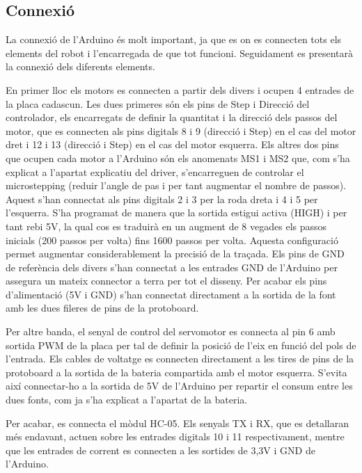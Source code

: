 \subsection{Connexió}

La connexió de l’Arduino és molt important, ja que es on es connecten tots els elements del robot i l’encarregada de que tot funcioni. Seguidament es presentarà la connexió dels diferents elements.

En primer lloc els motors es connecten a partir dels divers i ocupen 4 entrades de la placa cadascun. Les dues primeres són els pins de Step i Direcció del controlador, els encarregats de definir la quantitat i la direcció dels passos del motor, que es connecten als pins digitals 8 i 9 (direcció i Step) en el cas del motor dret i 12 i 13 (direcció i Step) en el cas del motor esquerra. Els altres dos pins que ocupen cada motor a l’Arduino són els anomenats MS1 i MS2 que, com s’ha explicat a l’apartat explicatiu del driver, s’encarreguen de controlar el microstepping (reduir l’angle de pas i per tant augmentar el nombre de passos). Aquest s’han connectat als pins digitals 2 i 3 per la roda dreta i 4 i 5 per l’esquerra. S’ha programat de manera que la sortida estigui activa (HIGH) i per tant rebi 5V, la qual cos es traduirà en un augment de 8 vegades els passos inicials (200 passos per volta) fins 1600 passos per volta. Aquesta configuració permet augmentar considerablement la precisió de la traçada. Els pins de GND de referència dels divers s’han connectat a les entrades GND de l’Arduino per assegura un mateix connector a terra per tot el disseny. Per acabar els pins d’alimentació (5V i GND) s’han connectat directament a la sortida de la font amb les dues fileres de pins de la protoboard. 

Per altre banda, el senyal de control del servomotor es connecta al pin 6 amb sortida PWM de la placa per tal de definir la posició de l’eix en funció del pols de l’entrada. Els cables de voltatge es connecten directament a les tires de pins de la protoboard a la sortida de la bateria compartida amb el motor esquerra.  S’evita així connectar-ho a la sortida de 5V de l’Arduino per repartir el consum entre les dues fonts, com ja s’ha explicat a l’apartat de la bateria. 

Per acabar, es connecta el mòdul HC-05. Els senyals TX i RX, que es detallaran més endavant, actuen sobre les entrades digitals 10 i 11 respectivament, mentre que les entrades de corrent es connecten a les sortides de 3,3V i GND de l’Arduino. 

